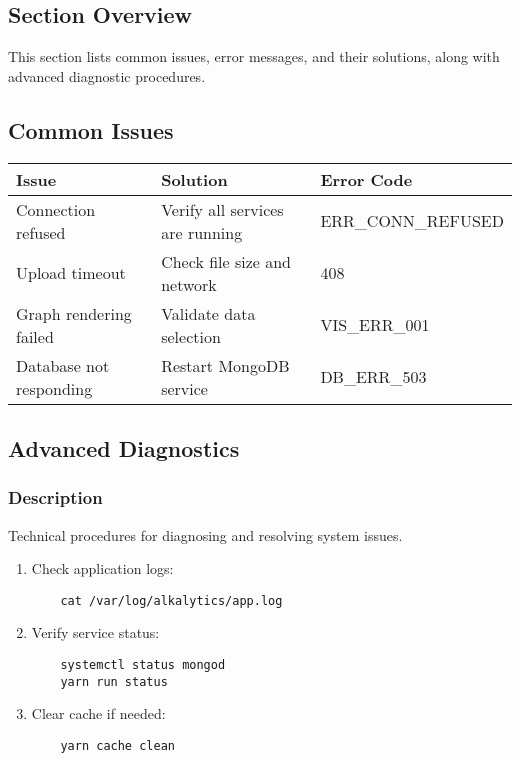 \documentclass[12pt]{article}
\begin{document}
\subsection*{Section Overview}
This section lists common issues, error messages, and their solutions, along
with advanced diagnostic procedures.

\subsection{Common Issues}
\begin{table}[H]
    \centering
    \begin{tabularx}{\textwidth}{lXl}
        \toprule
        \textbf{Issue} & \textbf{Solution} & \textbf{Error Code} \\
        \midrule
        Connection refused & Verify all services are running &
        ERR\_CONN\_REFUSED \\
        Upload timeout & Check file size and network & 408 \\
        Graph rendering failed & Validate data selection & VIS\_ERR\_001 \\
        Database not responding & Restart MongoDB service & DB\_ERR\_503 \\
        \bottomrule
    \end{tabularx}
\end{table}

\subsection{Advanced Diagnostics}
\subsubsection*{Description}
Technical procedures for diagnosing and resolving system issues.

\begin{enumerate}
    \item Check application logs:
    \begin{verbatim}
    cat /var/log/alkalytics/app.log
    \end{verbatim}
    
    \item Verify service status:
    \begin{verbatim}
    systemctl status mongod
    yarn run status
    \end{verbatim}
    
    \item Clear cache if needed:
    \begin{verbatim}
    yarn cache clean
    \end{verbatim}
\end{enumerate}
\end{document}
